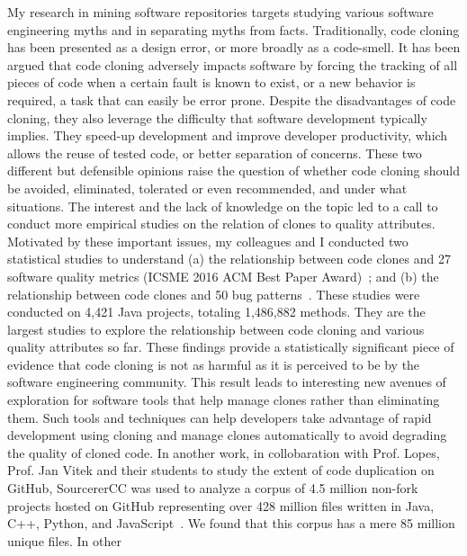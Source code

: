\documentclass[a4paper]{article}
\begin{document}
My research in mining software repositories targets studying various
software engineering myths and in separating myths from facts. 
Traditionally, code cloning has been presented as a design error, or more broadly as a code-smell. It has been argued that
code cloning adversely impacts software by forcing the tracking of all pieces of code when a
certain fault is known to exist, or a new behavior is required, a task that can easily be error
prone. Despite the disadvantages of code cloning, they also leverage the difficulty that software
development typically implies. They speed-up development and improve developer productivity,
which allows the reuse of tested code, or better separation of concerns. These two different but
defensible opinions raise the question of whether code cloning should be avoided, eliminated,
tolerated or even recommended, and under what situations. The interest and the lack of
knowledge on the topic led to a call to conduct more empirical studies on the relation of clones
to quality attributes. Motivated by these important issues, my colleagues and I conducted two statistical
studies to understand (a) the relationship between code clones and 27 software quality metrics
(ICSME 2016 ACM Best Paper Award)~\cite{quality-clones}; and (b) the relationship between code clones and 50 bug
patterns~\cite{bugpatterns}. These studies were conducted on 4,421 Java projects, totaling
1,486,882 methods. They are the largest studies to explore the
relationship between code cloning and various quality attributes so far. 
These findings provide a statistically significant piece of evidence that code cloning is not as
harmful as it is perceived to be by the software engineering community. This result leads to
interesting new avenues of exploration for software tools that help manage clones rather than
eliminating them. Such tools and techniques can help developers take advantage of rapid
development using cloning and manage clones automatically to avoid degrading the quality of
cloned code. In another work, in collobaration with Prof. Lopes, Prof. Jan Vitek and their students 
to study the extent of code duplication on GitHub, SourcererCC was used to 
analyze a corpus of 4.5 million non-fork projects hosted on GitHub representing over 428 million files written
in Java, C++, Python, and JavaScript~\cite{dejavu}. We found that this corpus has a mere 85 million unique files. In other
\end{document}
